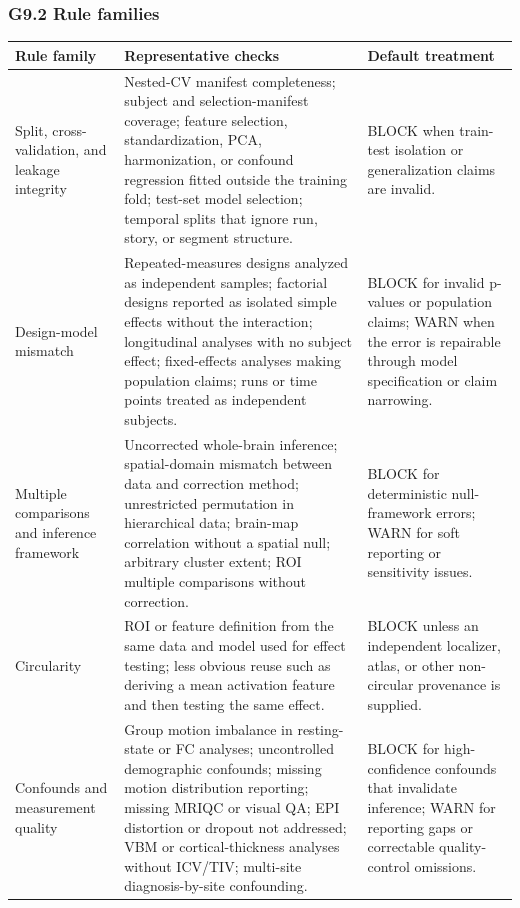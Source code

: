 \subsubsection{\texorpdfstring{\textbf{G9.2 Rule families}}{G9.2 Rule families}}

\begin{longtable}{|>{\RaggedRight\hspace{0pt}\arraybackslash}p{}|>{\RaggedRight\hspace{0pt}\arraybackslash}p{}|>{\RaggedRight\hspace{0pt}\arraybackslash}p{}|}
\hline
\rowcolor{brtablehead}\textbf{Rule family} & \textbf{Representative checks} & \textbf{Default treatment} \\
\hline
Split, cross-validation, and leakage integrity & Nested-CV manifest completeness; subject and selection-manifest coverage; feature selection, standardization, PCA, harmonization, or confound regression fitted outside the training fold; test-set model selection; temporal splits that ignore run, story, or segment structure. & BLOCK when train-test isolation or generalization claims are invalid. \\
\hline
Design-model mismatch & Repeated-measures designs analyzed as independent samples; factorial designs reported as isolated simple effects without the interaction; longitudinal analyses with no subject effect; fixed-effects analyses making population claims; runs or time points treated as independent subjects. & BLOCK for invalid p-values or population claims; WARN when the error is repairable through model specification or claim narrowing. \\
\hline
Multiple comparisons and inference framework & Uncorrected whole-brain inference; spatial-domain mismatch between data and correction method; unrestricted permutation in hierarchical data; brain-map correlation without a spatial null; arbitrary cluster extent; ROI multiple comparisons without correction. & BLOCK for deterministic null-framework errors; WARN for soft reporting or sensitivity issues. \\
\hline
Circularity & ROI or feature definition from the same data and model used for effect testing; less obvious reuse such as deriving a mean activation feature and then testing the same effect. & BLOCK unless an independent localizer, atlas, or other non-circular provenance is supplied. \\
\hline
Confounds and measurement quality & Group motion imbalance in resting-state or FC analyses; uncontrolled demographic confounds; missing motion distribution reporting; missing MRIQC or visual QA; EPI distortion or dropout not addressed; VBM or cortical-thickness analyses without ICV/TIV; multi-site diagnosis-by-site confounding. & BLOCK for high-confidence confounds that invalidate inference; WARN for reporting gaps or correctable quality-control omissions. \\

\end{longtable}
